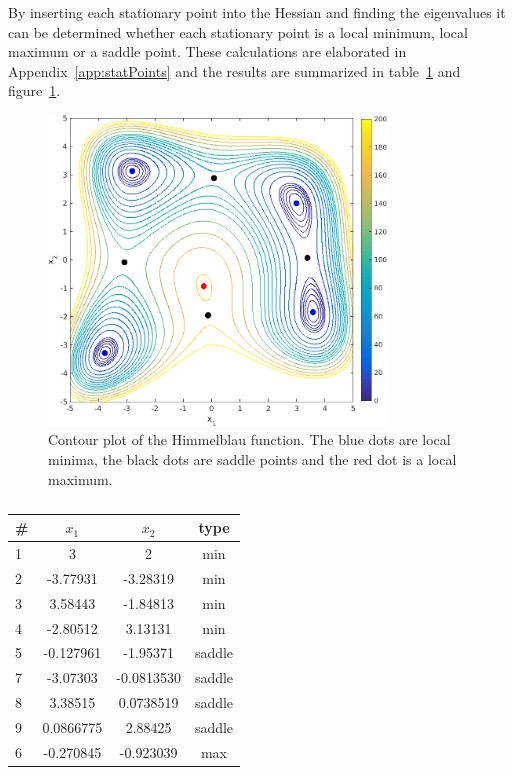 By inserting each stationary point into the Hessian and finding the eigenvalues it can be determined whether each stationary point is a local minimum, local maximum or a saddle point. These calculations are elaborated in Appendix~\ref{app:statPoints} and the results are summarized in table~\ref{tab:statPoints}  and figure~\ref{fig:himmelblau}.

\begin{figure}[htb]
\centering
\includegraphics[width=0.8\textwidth]{../img/himmelblauContours}
\caption{Contour plot of the Himmelblau function. The blue dots are local minima, the black dots are saddle points and the red dot is a local maximum.}
\label{fig:himmelblau}
\end{figure}

\begin{table}[htb]
\centering
\begin{tabular}{l|ccc}
\hline \hline 
\# 	& $x_1$ 		& $x_2$ 			& type \\ \hline
1 	&  3			& 2				& min \\
2 	& -3.77931	& -3.28319		& min \\
3 	&  3.58443	& -1.84813		& min \\
4 	& -2.80512	& 3.13131		& min \\
5	& -0.127961	& -1.95371		& saddle \\
7	& -3.07303	& -0.0813530		& saddle \\
8	& 3.38515	& 0.0738519		& saddle \\
9	& 0.0866775	& 2.88425		& saddle \\
6	& -0.270845	& -0.923039		& max \\
\hline \hline
\end{tabular}
\caption{}
\label{tab:statPoints}
\end{table}



